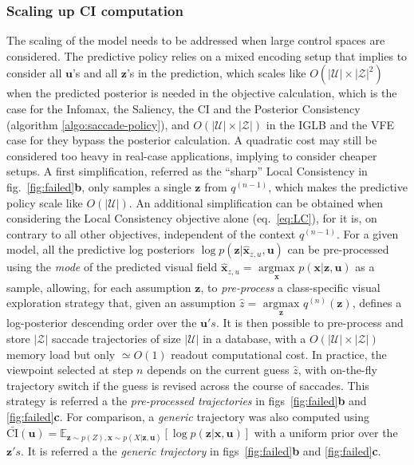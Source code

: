 \documentclass[12pt,twoside,openright]{article}
\begin{document}
\subsubsection{Scaling up CI computation}
The scaling of the model needs to be addressed when large control spaces are considered. The predictive policy relies on a mixed encoding setup that implies to consider all $\boldsymbol{u}$'s and all $\boldsymbol{z}$'s in the prediction, which scales like $O(|\mathcal{U}|\times|\mathcal{Z}|^2)$ when the predicted posterior is needed in the objective calculation, which is the case for the Infomax, the Saliency, the CI and the Posterior Consistency (algorithm \ref{algo:saccade-policy}), and $O(|\mathcal{U}|\times|\mathcal{Z}|)$ in the {\color{Purple}IGLB} and the VFE case for they bypass the posterior calculation. A quadratic cost may still be considered too heavy in real-case applications, implying to consider cheaper setups. A first simplification, referred as the ``sharp'' Local Consistency in  fig.~\ref{fig:failed}\textbf{b}, only samples a single $\boldsymbol{z}$ from $q^{(n-1)}$, which makes the predictive policy scale like $O(|\mathcal{U}|)$. An additional simplification can be obtained when considering the Local Consistency objective alone (eq.~\ref{eq:LC}), for it is, on contrary to all other objectives, independent of the context $q^{(n-1)}$. For a given model, all the predictive log posteriors $\log p(\boldsymbol{z}|\hat{\boldsymbol{x}}_{z,u}, \boldsymbol{u})$ can be pre-processed using the \emph{mode} of the predicted visual field $\hat{\boldsymbol{x}}_{z,u} = \underset{\boldsymbol{x}}{\text{ argmax }} p(\boldsymbol{x}|\boldsymbol{z}, \boldsymbol{u})$ as a sample, allowing, for each assumption $\boldsymbol{z}$, to \emph{pre-process} a class-specific visual exploration strategy that, given an assumption $\hat{z} = \underset{\boldsymbol{\boldsymbol{z}}}{\text{ argmax }} q^{(n)}(\boldsymbol{z})$, defines a log-posterior descending order over the $\boldsymbol{u}'s$. It is then possible to pre-process and store $|\mathcal{Z}|$ saccade trajectories of size $|\mathcal{U}|$ in a database, with a $O(|\mathcal{U}|\times|\mathcal{Z}|)$ memory load but only $\simeq O(1)$ readout computational cost. In practice, the viewpoint selected at step $n$ depends on the current guess $\hat{z}$, with on-the-fly trajectory switch if the guess is revised across the course of saccades. This strategy is referred a the \emph{pre-processed trajectories} in figs~\ref{fig:failed}\textbf{b} and \ref{fig:failed}\textbf{c}.
For comparison, a \emph{generic} trajectory was also computed using $\bar{\text{CI}}(\boldsymbol{u})
= \mathbb{E}_{\boldsymbol{z} \sim p(Z), \boldsymbol{x} \sim p(X|\boldsymbol{z}, \boldsymbol{u})}\left[ \log p(\boldsymbol{z}|\boldsymbol{x}, \boldsymbol{u})\right]$ with a uniform prior over the $\boldsymbol{z}'s$.  
It is referred a the \emph{generic trajectory} in figs~\ref{fig:failed}\textbf{b} and \ref{fig:failed}\textbf{c}.
\end{document}
